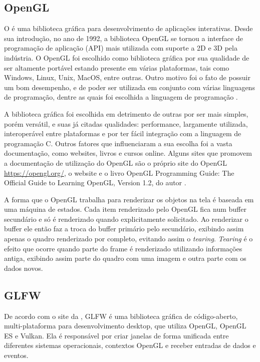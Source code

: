 \documentclass[12pt, %
openright,
oneside, %
a4paper,    %
brazil]{facom-ufu-abntex2}
\begin{document}
\subsection{OpenGL}
O  é uma biblioteca gráfica para desenvolvimento de aplicações interativas. Desde sua introdução, no ano de 1992, a biblioteca OpenGL se tornou a interface de programação de aplicação (API) mais utilizada com suporte a 2D e 3D pela indústria. O OpenGL foi escolhido como biblioteca gráfica por sua qualidade de ser altamente portável estando presente em várias plataformas, tais como Windows, Linux, Unix, MacOS, entre outras. Outro motivo foi o fato de possuir um bom desempenho, e de poder ser utilizada em conjunto com várias linguagens de programação, dentre as quais foi escolhida a linguagem de programação .

A biblioteca gráfica  foi escolhida em detrimento de outras por ser mais simples, porém versátil, e suas já citadas qualidades: performance, largamente utilizada, interoperável entre plataformas e por ter fácil integração com a linguagem de programação C. Outros fatores que influenciaram a sua escolha foi a vasta documentação, como websites, livros e cursos online. Alguns sites que promovem a documentação de utilização do OpenGL são o próprio site do OpenGL \url{https://opengl.org/}, o website  e o livro OpenGL Programming Guide: The Official Guide to Learning OpenGL, Version 1.2, do autor .

A forma que o OpenGL trabalha para renderizar os objetos na tela é baseada em uma máquina de estados. Cada item renderizado pelo OpenGL fica num buffer secundário e só é renderizado quando explicitamente solicitado. Ao renderizar o buffer ele então faz a troca do buffer primário pelo secundário, exibindo assim apenas o quadro renderizado por completo, evitando assim o \textit{tearing}. \textit{Tearing} é o efeito que ocorre quando parte do frame é renderizado utilizando informações antiga, exibindo assim parte do quadro com uma imagem e outra parte com os dados novos.

\subsection{GLFW}
De acordo com o site da , GLFW é uma biblioteca gráfica de código-aberto, multi-plataforma para desenvolvimento desktop, que utiliza OpenGL, OpenGL ES e Vulkan. Ela é responsável por criar janelas de forma unificada entre diferentes sistemas operacionais, contextos OpenGL e receber entradas de dados e eventos.
\end{document}
